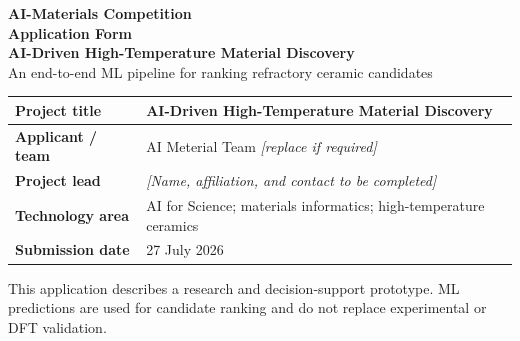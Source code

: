 \documentclass[10pt,a4paper]{article}
\renewcommand{\arraystretch}{1.15}
\newcommand{\field}[2]{\textbf{#1} & #2\\\hline}
\begin{document}
\thispagestyle{empty}
\begin{center}
  {\Large\bfseries AI-Materials Competition\\[2mm] Application Form}\\[13mm]
  {\LARGE\bfseries AI-Driven High-Temperature Material Discovery}\\[3mm]
  {\large An end-to-end ML pipeline for ranking refractory ceramic candidates}
\end{center}
\vfill
\renewcommand{\arraystretch}{1.7}
\begin{tabularx}{0.82\linewidth}{>{\raggedright\arraybackslash}p{48mm}X}
\hline
\field{Project title}{AI-Driven High-Temperature Material Discovery}
\field{Applicant / team}{AI Meterial Team \quad \textit{[replace if required]}}
\field{Project lead}{\textit{[Name, affiliation, and contact to be completed]}}
\field{Technology area}{AI for Science; materials informatics; high-temperature ceramics}
\field{Submission date}{27 July 2026}
\end{tabularx}
\vfill
\begin{center}\small
This application describes a research and decision-support prototype.\newline
ML predictions are used for candidate ranking and do not replace experimental or DFT validation.
\end{center}
\newpage
\end{document}

